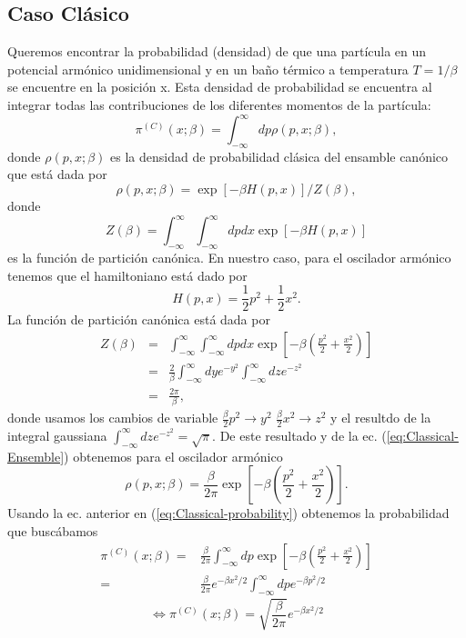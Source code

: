 \documentclass[%
 reprint,
 amsmath,amssymb,
 aps,
 pra,
]{revtex4-2}
\begin{document}
\subsection{Caso Clásico} \label{subsec:caso-clasico}
Queremos encontrar la probabilidad (densidad) de que una partícula en un potencial armónico unidimensional y en un baño térmico a temperatura $T = 1/\beta$ se encuentre en la posición x. Esta densidad de probabilidad se encuentra al integrar todas las contribuciones de los diferentes momentos de la partícula:
\begin{equation}
	\pi^{(C)}(x;\beta) = \int_{-\infty}^\infty dp \rho(p,x;\beta),  \label{eq:Classical-probability}
\end{equation}
donde $\rho(p,x;\beta)$ es la densidad de probabilidad clásica del ensamble canónico que está dada por
\begin{equation}
	\rho(p,x;\beta) = \exp[-\beta H(p,x)] / Z(\beta) ,  \label{eq:Classical-Ensemble}
\end{equation}
donde
\begin{equation}
	Z(\beta) = \int_{-\infty}^\infty \int_{-\infty}^\infty dp dx \exp[-\beta H(p,x)]
\end{equation} 
es la función de partición canónica.
En nuestro caso, para el oscilador armónico tenemos que el hamiltoniano está dado por
\begin{equation}
	H(p,x) = \frac{1}{2} p^2 + \frac{1}{2} x^2. \label{eq:Classical-Hamiltonian}
\end{equation}
La función de partición canónica está dada por
\begin{eqnarray}
	Z(\beta) 	&=& \int_{-\infty}^\infty \int_{-\infty}^\infty dp dx \exp[-\beta \left( \frac{p^2}{2} + \frac{x^2}{2} \right) ] \\ 
				&=& \frac{2}{\beta} \int_{-\infty}^\infty dy e^{-y^2} \int_{-\infty}^\infty dz e^{-z^2} \nonumber \\
				&=& \frac{2\pi}{\beta},
\end{eqnarray}
donde usamos los cambios de variable $\frac{\beta}{2}p^2 \rightarrow y^2$ $\frac{\beta}{2}x^2 \rightarrow z^2$ y el resultdo de la integral gaussiana $\int_{-\infty}^\infty dz e^{-z^2} = \sqrt{\pi}$. De este resultado y de la ec. (\ref{eq:Classical-Ensemble}) obtenemos para el oscilador armónico
\begin{equation}
	\rho(p,x;\beta) = \frac{\beta}{2\pi} \exp[-\beta \left( \frac{p^2}{2} + \frac{x^2}{2} \right) ] \label{eq:HO-Classical-Ensemble}.
\end{equation}
Usando la ec. anterior en (\ref{eq:Classical-probability}) obtenemos la probabilidad que buscábamos 
\begin{align}
	\pi^{(C)}(x;\beta) =& \frac{\beta}{2\pi}\int_{-\infty}^\infty dp \exp[-\beta \left( \frac{p^2}{2} + \frac{x^2}{2} \right)] \nonumber \\
	=&\frac{\beta}{2\pi}e^{-\beta x^2/2}
	\int_{-\infty}^\infty dp e^{-\beta p^2/2} \nonumber
\end{align}
\begin{equation}
	\!\!\!\!\!\!\!\!\!\!\!\!\!\!\!\!\!\!\!\!\!\!\! \iff \pi^{(C)}(x;\beta) = \sqrt{\frac{\beta}{2\pi}}e^{-\beta x^2/2} \label{eq:pi-classical-finale}
\end{equation}
\end{document}
